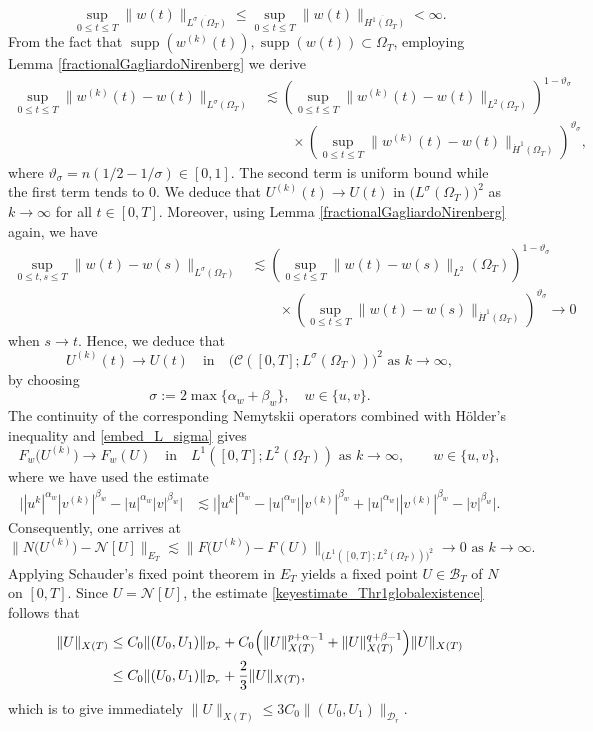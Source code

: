 \documentclass[11pt,reqno]{amsart}
\DeclareMathOperator{\supp}{supp}
\newcommand{\ity}{\infty}
\newcommand{\tron}[1]{\left(#1\right)}
\begin{document}
	\[
	\sup_{0\leq t\leq T}\|w(t)\|_{\dot{L^\sigma(\Omega_T)}}\leq \sup_{0\leq t\leq T}\|w(t)\|_{\dot{H^1(\Omega_T)}}<\infty.
	\]
	From the fact that $\supp(w^{(k)}(t)),\supp(w(t))\subset \Omega_T$, employing Lemma \ref{fractionalGagliardoNirenberg} we derive
	\[
	\begin{aligned}
		\sup_{0\leq t\leq T}\|w^{(k)}(t)-w(t)\|_{L^{\sigma}(\Omega_T)}&\lesssim \tron{\sup_{0\leq t\leq T}\|w^{(k)}(t)-w(t)\|_{L^2(\Omega_T)}}^{1-\vartheta_\sigma}\\
		&\qquad\times \tron{\sup_{0\leq t\leq T}\|w^{(k)}(t)-w(t)\|_{\dot{H}^1(\Omega_T)}}^{\vartheta_\sigma},
	\end{aligned}
	\]
	where $\vartheta_\sigma=n(1/2-1/\sigma)\in [0,1]$. The second term is uniform bound while the first term tends to $0$. We deduce that
	$U^{(k)}(t)\to U(t)$ in $\bigl(L^\sigma(\Omega_T)\bigr)^2$ as $k\to\ity$ for all $t\in [0,T]$. Moreover, using Lemma \ref{fractionalGagliardoNirenberg} again, we have 
	\[
	\begin{aligned}
		\sup_{0\leq t,s\leq T}\|w(t)-w(s)\|_{L^{\sigma}(\Omega_T)}&\lesssim \tron{\sup_{0\leq t\leq T}\|w(t)-w(s)\|_{L^2}(\Omega_T)}^{1-\vartheta_\sigma}\\
		&\qquad \times \tron{\sup_{0\leq t\leq T}\|w(t)-w(s)\|_{\dot{H}^1(\Omega_T)}}^{\vartheta_\sigma}\to 0 
	\end{aligned}
	\]
	when $s\to t$. Hence, we deduce that
	\begin{equation}\label{embed_L_sigma}
		U^{(k)}(t)\to U(t)\quad\text{in}\quad \bigl(\mathcal{C}([0,T];L^\sigma(\Omega_T))\bigr)^2 \text{ as } k\to\ity,
	\end{equation}
	by choosing
	\begin{equation}\label{choice_of_z}
		\sigma:=2\max\{\alpha_w+\beta_w\},\quad w\in\{u,v\}.
	\end{equation}
	The continuity of the corresponding Nemytskii operators combined with H\"older's inequality and \eqref{embed_L_sigma} gives
	\[
	F_w\big(U^{(k)}\big)\to F_w(U) \quad\text{in}\quad L^1([0,T];L^2(\Omega_T))\text{ as } k\to\ity, \qquad w\in\{u,v\},
	\]
	where we have used the estimate
	\[
	\begin{aligned}
		\big||u^k|^{\alpha_w}|v^{(k)}|^{\beta_w}-|u|^{\alpha_w}|v|^{\beta_w}\big|&\lesssim \big||u^k|^{\alpha_w}-|u|^{\alpha_w}\big||v^{(k)}|^{\beta_w}+|u|^{\alpha_w}\big||v^{(k)}|^{\beta_w}-|v|^{\beta_w}\big|.
	\end{aligned}
	\]
	Consequently, one arrives at
	\[
	\|N\big(U^{(k)}\big)-\mathcal{N}[U]\|_{E_T}\lesssim \|F\big(U^{(k)}\big)-F(U)\|_{\bigl(L^1([0,T];L^2(\Omega_T))\bigr)^2}\to 0 \text{ as } k\to\ity.
	\]
	Applying Schauder's fixed point theorem in $E_T$ yields a fixed point $U\in\mathcal{B}_T$ of $N$ on $[0,T]$. Since $U=\mathcal{N}[U]$, the estimate \eqref{keyestimate_Thr1globalexistence} follows that
	\[
	\begin{aligned}
		\|U\|_{X(T)}&\leq C_0\|(U_0,U_1)\|_{\mathcal D_r}+C_0\Bigl(\|U\|_{X(T)}^{p+\alpha-1}+\|U\|_{X(T)}^{q+\beta-1}\Bigr)\|U\|_{X(T)}\\
		&\leq C_0\|(U_0,U_1)\|_{\mathcal D_r}+\frac{2}{3}\|U\|_{X(T)},
	\end{aligned}
	\]
	which is to give immediately $\|U\|_{X(T)}
	\leq 3C_0\|(U_0,U_1)\|_{\mathcal D_r}$. \medskip
	
\end{document}
